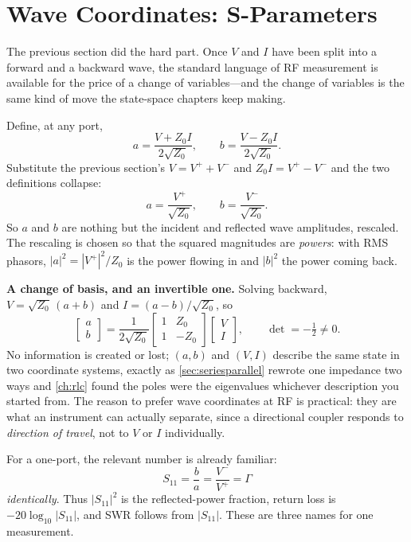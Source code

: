 \section{Wave Coordinates: S-Parameters}
\label{sec:sparams}
The previous section did the hard part. Once \(V\) and \(I\) have been split into a
forward and a backward wave, the standard language of RF measurement is available for
the price of a change of variables---and the change of variables is the same kind of
move the state-space chapters keep making.

Define, at any port,
\[
a=\frac{V+Z_0I}{2\sqrt{Z_0}},
\qquad
b=\frac{V-Z_0I}{2\sqrt{Z_0}} .
\]
Substitute the previous section's \(V=V^{+}+V^{-}\) and \(Z_0I=V^{+}-V^{-}\) and the
two definitions collapse:
\[
a=\frac{V^{+}}{\sqrt{Z_0}},
\qquad
b=\frac{V^{-}}{\sqrt{Z_0}} .
\]
So \(a\) and \(b\) are nothing but the incident and reflected wave amplitudes,
rescaled. The rescaling is chosen so that the squared magnitudes are \emph{powers}:
with RMS phasors, \(|a|^2=|V^{+}|^2/Z_0\) is the power flowing in and \(|b|^2\) the
power coming back.

\begin{controlsbox}
\textbf{A change of basis, and an invertible one.} Solving backward,
\(V=\sqrt{Z_0}\,(a+b)\) and \(I=(a-b)/\sqrt{Z_0}\), so
\[
\begin{bmatrix}a\\b\end{bmatrix}
=\frac{1}{2\sqrt{Z_0}}
\begin{bmatrix}1 & Z_0\\ 1 & -Z_0\end{bmatrix}
\begin{bmatrix}V\\I\end{bmatrix},
\qquad
\det=-\tfrac12\ne0 .
\]
No information is created or lost; \((a,b)\) and \((V,I)\) describe the same state in
two coordinate systems, exactly as \cref{sec:seriesparallel} rewrote one impedance two
ways and \cref{ch:rlc} found the poles were the eigenvalues whichever description you
started from. The reason to prefer wave coordinates at RF is practical: they are what
an instrument can actually separate, since a directional coupler responds to
\emph{direction of travel}, not to \(V\) or \(I\) individually.
\end{controlsbox}

For a one-port, the relevant number is already familiar:
\[
S_{11}=\frac{b}{a}=\frac{V^{-}}{V^{+}}=\Gamma
\]
\emph{identically}. Thus \(|S_{11}|^2\) is the reflected-power fraction, return
loss is \(-20\log_{10}|S_{11}|\), and SWR follows from \(|S_{11}|\). These are
three names for one measurement.


